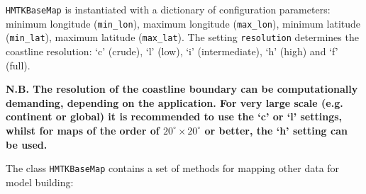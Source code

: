 \verb=HMTKBaseMap= is instantiated with a dictionary of configuration parameters: minimum longitude (\verb=min_lon=), maximum longitude (\verb=max_lon=), minimum latitude (\verb=min_lat=), maximum latitude (\verb=max_lat=). The setting \verb=resolution= determines the coastline resolution: `c' (crude), `l' (low), `i' (intermediate), `h' (high) and `f' (full).

\noindent \textbf{N.B. The resolution of the coastline boundary can be computationally demanding, depending on the application. For very large scale (e.g. continent or global) it is recommended to use the `c' or `l' settings, whilst for maps of the order of $20^{\circ} \times 20^{\circ}$ or better, the `h' setting can be used.} 

The class \verb=HMTKBaseMap= contains a set of methods for mapping other data for model building:
